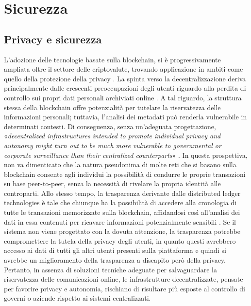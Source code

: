 \chapter{Sicurezza}
\section{Privacy e sicurezza}
L'adozione delle tecnologie basate sulla blockchain, si è progressivamente ampliata oltre il settore delle criptovalute, trovando applicazione in ambiti come quello della protezione della privacy \cite{borroni_blockchain_2019}.
La spinta verso la decentralizzazione deriva principalmente dalle crescenti preoccupazioni degli utenti riguardo alla perdita di controllo sui propri dati personali archiviati online \cite{rodota_quattro_paradigmi_2018} \cite{alpa_identita_digitale_2017}.
A tal riguardo, la struttura stessa della blockchain offre potenzialità per tutelare la riservatezza delle informazioni personali; tuttavia, l'analisi dei metadati può renderla vulnerabile in determinati contesti. Di conseguenza, senza un'adeguata progettazione,
«\textit{decentralized infrastructures intended to promote individual privacy and autonomy might turn out to be much more vulnerable to governmental or corporate surveillance than their centralized counterparts}» \cite{de_filippi_interplay_2016}.
In questa prospettiva, non va dimenticato che la natura pseudonima di molte
reti che si basano sulla blockchain consente agli individui la possibilità di
condurre le proprie transazioni su base peer-to-peer, senza la necessità di
rivelare la propria identità alle controparti.
Allo stesso tempo, la trasparenza derivante dalle distributed ledger technologies è tale che chiunque ha la possibilità di accedere alla
cronologia di tutte le transazioni memorizzate sulla blockchain, affidandosi così all’analisi dei dati in essa contenuti per ricavare informazioni potenzialmente sensibili \cite{marr_history_blockchain_2018}.
Se il sistema non viene progettato con la dovuta attenzione, la trasparenza potrebbe compromettere la tutela della privacy degli utenti, in quanto questi avrebbero
accesso ai dati di tutti gli altri utenti presenti sulla piattaforma e quindi si avrebbe un miglioramento della trasparenza 
a discapito però della privacy.\\
Pertanto, in assenza di soluzioni tecniche adeguate per salvaguardare la riservatezza delle comunicazioni online, le infrastrutture decentralizzate, pensate per favorire privacy e autonomia, 
rischiano di risultare più esposte al controllo di governi o aziende rispetto ai sistemi centralizzati.
